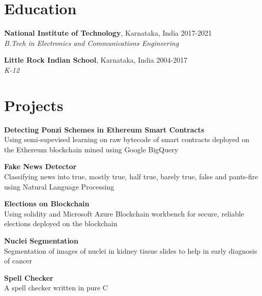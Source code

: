 \documentclass[margin]{res}
\begin{document}
  \address{National Institute of Technology\\Karnataka, India\\linkedin/in/rshwndsz}
  \address{(91+) 9611212081\\russel.171ec143@nitk.edu.in\\github.com/rshwndsz}

  \begin{resume}
    \section{Education}
      \textbf{National Institute of Technology}, Karnataka, India\hfill 
      2017-2021
      \\
      {\sl B.Tech in Electronics and Communications Engineering}\hfill 
      

      \textbf{Little Rock Indian School}, Karnataka, India\hfill
      2004-2017
      \\
      {\sl K-12}\hfill

    \section{Projects}
      \par
      \textbf{Detecting Ponzi Schemes in Ethereum Smart Contracts}\\
      Using semi-supevised learning on raw bytecode of smart contracts deployed on the Ethereum blockchain mined using Google BigQuery

      \par
      \textbf{Fake News Detector}\\
      Classifying news into true, mostly true, half true, barely true, false and pants-fire using Natural Language Processing

      \par
      \textbf{Elections on Blockchain}\\
      Using solidity and Microsoft Azure Blockchain workbench for secure, reliable elections deployed on the blockchain

      \par
      \textbf{Nuclei Segmentation}\\
      Segmentation of images of nuclei in kidney tissue slides to help in early diagnosis of cancer

      \par
      \textbf{Spell Checker}\\
      A spell checker written in pure C


\end{resume}
\end{document}
